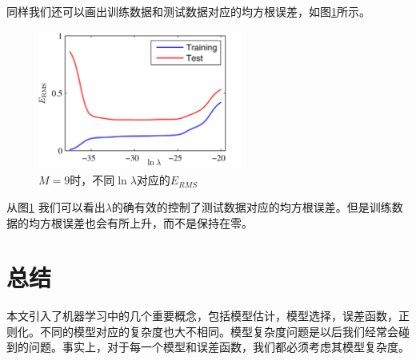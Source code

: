 \documentclass[10pt,a4paper,UTF8]{article}
\begin{document}
同样我们还可以画出训练数据和测试数据对应的均方根误差，如图\ref{fig:org9ceb81b}所示。
\begin{figure}[htbp]
\centering
\includegraphics[width=0.6\textwidth]{../../img/computer_prml/20170430figure1dot8.png}
\caption{\label{fig:org9ceb81b}
\(M=9\)时，不同\(\ln \lambda\)对应的\(E_{RMS}\)}
\end{figure}

从图\ref{fig:org9ceb81b} 我们可以看出\(\lambda\)的确有效的控制了测试数据对应的均方根误差。但是训练数据的均方根误差也会有所上升，而不是保持在零。
\section{总结}
\label{sec:orge2248ef}


本文引入了机器学习中的几个重要概念，包括模型估计，模型选择，误差函数，正则化。不同的模型对应的复杂度也大不相同。模型复杂度问题是以后我们经常会碰到的问题。事实上，对于每一个模型和误差函数，我们都必须考虑其模型复杂度。
\end{document}
